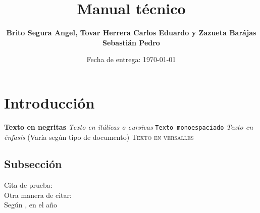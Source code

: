 \documentclass[letterpaper,10.5pt]{article} %
\title{Manual técnico}
\author{\textbf{Brito Segura Angel, Tovar Herrera Carlos Eduardo y Zazueta Barájas Sebastián Pedro}}
\date{Fecha de entrega: \today}
\begin{document}
    \pagestyle{fancy} %
    \maketitle %
    
    \section{Introducción}
	    \textbf{Texto en negritas} \newline
		\textit{Texto en itálicas o cursivas} \newline
		\texttt{Texto monoespaciado} \newline
		\emph{Texto en énfasis} (Varía según tipo de documento) \newline
		\textsc{Texto en versalles} \newline

    \subsection{Subsección}
	    Cita de prueba: \cite{kim1995novel}\\ %

		Otra manera de citar: \citet{ipsum2010lorem}\\ %

		Según \citeauthor{ipsum2010lorem}, %
		en el año \citeyear{ipsum2010lorem}\\ %

	\hfill \break %

	
\end{document}
